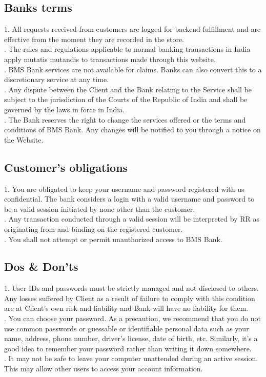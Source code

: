 \documentclass{article}
\begin{document}
\subsection{Banks terms}
1. All requests received from customers are logged for backend fulfillment and are effective from the moment they are recorded in the store.\\ \hfill {}. The rules and regulations applicable to normal banking transactions in India apply mutatis mutandis to transactions made through this website.\\ \hfill {}. BMS Bank services are not available for claims. Banks can also convert this to a discretionary service at any time.\\ \hfill {}. Any dispute between the Client and the Bank relating to the Service shall be subject to the jurisdiction of the Courts of the Republic of India and shall be governed by the laws in force in India.\\ \hfill {}. The Bank reserves the right to change the services offered or the terms and conditions of BMS Bank. Any changes will be notified to you through a notice on the Website. 
\subsection{Customer’s obligations }
1. You are obligated to keep your username and password registered with us confidential. The bank considers a login with a valid username and password to be a valid session initiated by none other than the customer.\\ \hfill {}. Any transaction conducted through a valid session will be interpreted by RR as originating from and binding on the registered customer.\\ \hfill {}. You shall not attempt or permit unauthorized access to BMS Bank.
\subsection{Dos & Don’ts}
1. User IDs and passwords must be strictly managed and not disclosed to others. Any losses suffered by Client as a result of failure to comply with this condition are at Client's own risk and liability and Bank will have no liability for them.\\ \hfill {}. You can choose your password. As a precaution, we recommend that you do not use common passwords or guessable or identifiable personal data such as your name, address, phone number, driver's license, date of birth, etc. Similarly, it's a good idea to remember your password rather than writing it down somewhere.\\ \hfill {}. It may not be safe to leave your computer unattended during an active session. This may allow other users to access your account information.
\end{document}
